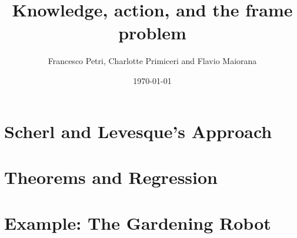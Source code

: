\documentclass{beamer}
\title{Knowledge, action, and the frame problem}
\author{Francesco Petri, Charlotte Primiceri and Flavio Maiorana}
\date{\today}
\begin{document}
\maketitle


\section{Scherl and Levesque's Approach}


\section{Theorems and Regression}


\section{Example: The Gardening Robot}


\footlinecolor{}

\backmatter
\end{document}
